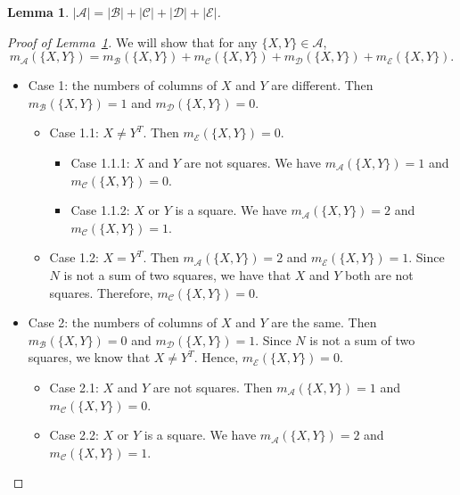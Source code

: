 \documentclass[a4paper,oneside,reqno]{amsart}
\theoremstyle{plain}
\newtheorem{lemma}[theorem]{Lemma}
\theoremstyle{definition}
\theoremstyle{remark}
\newcommand{\A}{\mathcal{A}}
\newcommand{\B}{\mathcal{B}}
\newcommand{\C}{\mathcal{C}}
\newcommand{\D}{\mathcal{D}}
\newcommand{\E}{\mathcal{E}}
\begin{document}
        \begin{lemma}
        \label{countingmultisets}
			$|\mathcal{A}|=|\mathcal{B}| + |\mathcal{C}| + |\mathcal{D}| + |\mathcal{E}|$. 
		\end{lemma}

        \begin{proof}[Proof of Lemma~\ref{countingmultisets}]

            We will show that for any $\{X,Y\} \in \mathcal{A}$, 
            \[
            m_\mathcal{A}(\{X,Y\}) = m_{\B}(\{X,Y\}) + m_{\C}(\{X,Y\}) + m_{\D}(\{X,Y\}) + m_{\E}(\{X,Y\}). 
            \]
            \begin{itemize}
                \item Case 1: the numbers of columns of $X$ and $Y$ are different. Then $m_\B(\{X,Y\}) = 1$ and $m_\D(\{X,Y\}) = 0$. 
                \begin{itemize}
                    \item Case 1.1: $X \neq Y^T$. Then $m_\E(\{X,Y\}) = 0$. 
                    \begin{itemize}
                        \item Case 1.1.1: $X$ and $Y$ are not squares. We have $m_\A(\{X,Y\}) = 1$ and $m_\C(\{X,Y\}) = 0$. 
                        \item Case 1.1.2: $X$ or $Y$ is a square. We have $m_\A(\{X,Y\}) = 2$ and $m_\C(\{X,Y\}) = 1$. 
                    \end{itemize}
                    \item Case 1.2: $X = Y^T$. Then $m_\A(\{X,Y\}) = 2$ and $m_\E(\{X,Y\}) = 1$. Since $N$ is not a sum of two squares, we have that $X$ and $Y$ both are not squares. Therefore, $m_\C(\{X,Y\}) = 0$. 
                \end{itemize}
                \item Case 2: the numbers of columns of $X$ and $Y$ are the same. Then $m_\B(\{X,Y\}) = 0$ and $m_\D(\{X,Y\}) = 1$. Since $N$ is not a sum of two squares, we know that $X \neq Y^T$. Hence, $m_\E(\{X,Y\}) = 0$. 
                \begin{itemize}
                    \item Case 2.1: $X$ and $Y$ are not squares. Then $m_\A(\{X,Y\}) = 1$ and $m_\C(\{X,Y\}) = 0$. 
                    \item Case 2.2: $X$ or $Y$ is a square. We have $m_\A(\{X,Y\}) = 2$ and $m_\C(\{X,Y\}) = 1$. 
                \end{itemize}

\end{itemize}
\end{proof}
\end{document}
